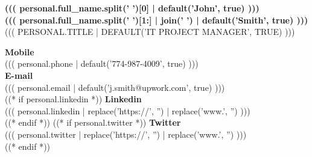 \documentclass[10pt,a4paper]{article}
\begin{document}

\vspace*{1.5cm}

\noindent\begin{minipage}[t]{0.58\textwidth}
  \vspace{0pt}
  {\fontsize{48}{48}\selectfont\color{accent}\bfseries ((( personal.full_name.split(' ')[0] | default('John', true) )))}\\[2pt]
  {\fontsize{48}{48}\selectfont\color{texthead}\bfseries ((( personal.full_name.split(' ')[1:] | join(' ') | default('Smith', true) )))}\\[15pt]
  {\fontsize{13}{13}\selectfont\color{texthead}\lsstyle\MakeUppercase{((( personal.title | default('IT Project Manager', true) )))}}
\end{minipage}%
\begin{minipage}[t]{0.42\textwidth}
  \vspace{25pt}
  \raggedright
  {\small\color{accent}\bfseries Mobile}\\
  {\small ((( personal.phone | default('774-987-4009', true) )))}\\[8pt]
  {\small\color{accent}\bfseries E-mail}\\
  {\small ((( personal.email | default('j.smith@upwork.com', true) )))}\\[8pt]
  ((* if personal.linkedin *))
  {\small\color{accent}\bfseries Linkedin}\\
  {\small ((( personal.linkedin | replace('https://', '') | replace('www.', '') )))}\\[8pt]
  ((* endif *))
  ((* if personal.twitter *))
  {\small\color{accent}\bfseries Twitter}\\
  {\small ((( personal.twitter | replace('https://', '') | replace('www.', '') )))}\\
  ((* endif *))
\end{minipage}

\vspace{1.2cm}
\end{document}

